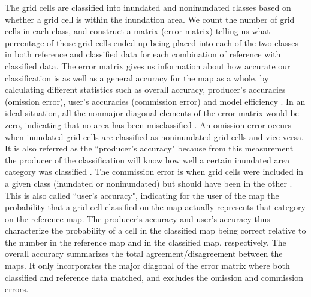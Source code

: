 \documentclass[12pt,letterpaper]{article}
\begin{document}
 The grid cells
are classified into inundated and noninundated classes based on
whether a grid cell is within the inundation area.  We count the
number of grid cells in each class, and construct a matrix (error
matrix) telling us what percentage of those grid cells ended up being
placed into each of the two classes in both reference and classified
data for each combination of reference with classified data.
The error matrix gives us information about how accurate
  our classification is as well as a general accuracy for the map as a
  whole, by calculating different statistics such as overall accuracy,
  producer's accuracies (omission error), user's accuracies
  (commission error) and model efficiency \citep{Legorreta2009}. In an
  ideal situation, all the nonmajor diagonal elements of the error
  matrix would be zero, indicating that no area has been misclassified
  \citep{Congalton}. An omission error occurs when inundated grid 
  cells are classified as noninundated grid cells and vice-versa. 
It is also referred as the ``producer's accuracy" because from this
measurement the producer of the classification will know how well a
certain inundated area category was classified \citep{Congalton}.  
The commission error is when grid cells were included in a given class 
(inundated or noninundated) but should have been in the other
\citep{Lillesand2000}. This is also called ``user's accuracy",
  indicating for the user of the map the probability that a grid cell
  classified on the map actually represents that category on the
  reference map.  The producer's accuracy and user's accuracy thus
characterize the probability of a cell in the classified map being
correct relative to the number in the reference map and in the
classified map, respectively. The overall accuracy summarizes the
total agreement/disagreement between the maps. It only incorporates
the major diagonal of the error matrix where both classified and
reference data matched, and excludes the omission and commission
errors.
\end{document}
